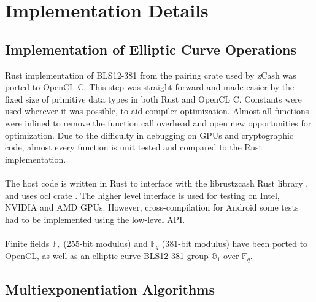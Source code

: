 \chapter{Implementation Details} %

\label{Chapter5} %


\section{Implementation of Elliptic Curve Operations}


Rust implementation of BLS12-381 from the pairing crate \cite{githubpairing} used by zCash was ported to OpenCL C. This step was straight-forward and made easier by the fixed size of primitive data types in both Rust and OpenCL C. Constants were used wherever it was possible, to aid compiler optimization. Almost all functions were inlined to remove the function call overhead and open new opportunities for optimization. Due to the difficulty in debugging on GPUs and cryptographic code, almost every function is unit tested and compared to the Rust implementation.\\
\\
The host code is written in Rust to interface with the librustzcash Rust library \cite{githublibrustzcash}, and uses ocl crate \cite{githubocl}. The higher level interface is used for testing on Intel, NVIDIA and AMD GPUs. However, cross-compilation for Android some tests had to be implemented using the low-level API.\\
\\
Finite fields $\mathbb{F}_r$ (255-bit modulus) and $\mathbb{F}_q$ (381-bit modulus) have been ported to OpenCL, as well as an elliptic curve BLS12-381 group $\mathbb{G}_1$ over $\mathbb{F}_q$.

\section{Multiexponentiation Algorithms}

